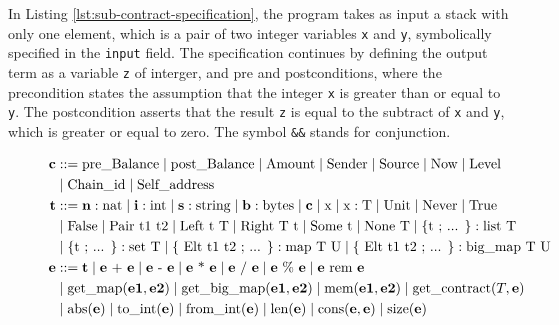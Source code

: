 \documentclass[runningheads]{llncs}
\begin{document}
In Listing \ref{lst:sub-contract-specification}, the program takes as input a stack with only one
element, which is a pair of two integer variables \lstinline/x/ and \lstinline/y/, symbolically specified in the \lstinline|input| field. 
The specification continues by defining the output term as a variable \lstinline/z/ of interger, and 
pre and postconditions, where the precondition states the assumption
that the integer \lstinline/x/ is greater than or equal to  \lstinline/y/. The postcondition asserts that the result
\lstinline/z/ is equal to the subtract of
\lstinline/x/ and \lstinline/y/, which is greater or equal to
zero. The symbol \lstinline/&&/ stands for conjunction. 
\begin{figure}[tp]
\begin{align*}
\textbf{c} & ::= 
    \text{pre\_Balance}
   \Mid \text{post\_Balance}
   \Mid \text{Amount}
   \Mid \text{Sender}
   \Mid \text{Source} 
   \Mid \text{Now}
   \Mid \text{Level} \\
   &\Mid \text{Chain\_id}
   \Mid \text{Self\_address}\\
\textbf{t} &::= 
   \textbf{n}: \text{nat}
   \Mid \textbf{i}: \text{int}
   \Mid  \textbf{s}: \text{string} 
   \Mid  \textbf{b}: \text{bytes}
   \Mid  \textbf{c}  
   \Mid  \text{x} 
   \Mid \text{x}: \text{T} 
   \Mid \UNIT 
   \Mid \NEVER 
   \Mid \TRUE \\
   &\Mid \FALSE 
   \Mid \PAIR\ \text{t1 t2}
   \Mid \LEFT\ \text{t}\  \text{T}
   \Mid \RIGHT\ \text{T}\ \text{t}
   \Mid \SOME\ \text{t}
   \Mid \NONE\ \text{T} 
   \Mid \text{\{t ; ... \}}: \text{list T} \\
   &\Mid \text{\{t ; ... \}}: \text{set T} 
   \Mid \text{\{ Elt t1 t2 ; ... \}}: \text{map T U}
   \Mid \text{\{ Elt t1 t2 ; ... \}}: \text{big\_map T U} \\
\textbf{e} & :: = \textbf{t}  \Mid \textbf{e} \text{ + } \textbf{e}\Mid \textbf{e} \text{ - } \textbf{e}  \Mid \textbf{e} \text{ * } \textbf{e} \Mid \textbf{e} \text{ / } \textbf{e} \Mid \textbf{e} \text{ \% } \textbf{e} \Mid \textbf{e} \text{ rem } \textbf{e} \\
& 
 \Mid \text{get\_map} (\textbf{e1}, \textbf{e2}) 
 \Mid \text{get\_big\_map} (\textbf{e1}, \textbf{e2})  
 \Mid \text{mem} (\textbf{e1}, \textbf{e2})  
 \Mid \text{get\_contract} (T, \textbf{e})    \\
& \Mid \text{abs} (\textbf{e})  
 \Mid \text{to\_int} (\textbf{e})  
 \Mid \text{from\_int} (\textbf{e})  
 \Mid \text{len} (\textbf{e})
 \Mid \text{cons} (\textbf{e}, \textbf{e})
 \Mid \text{size} (\textbf{e})

\end{align*}
\end{figure}
\end{document}
